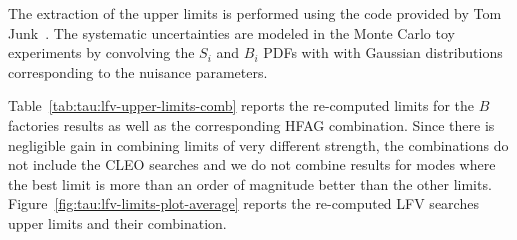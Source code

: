 The extraction of the upper limits is performed using the code provided by
Tom Junk~\cite{junk:2007:cdfnote}. The systematic uncertainties are modeled
in the Monte Carlo toy experiments by convolving the $S_i$ and $B_i$
PDFs with with Gaussian distributions corresponding to the nuisance
parameters. 

Table~\ref{tab:tau:lfv-upper-limits-comb} reports the re-computed limits
for the $B$ factories results as well as the corresponding HFAG
combination. Since there is negligible gain in combining limits of very
different strength, the combinations do not include the CLEO searches and we do not
combine results for modes where the best limit is more than an order of
magnitude better than the other limits.
Figure~\ref{fig:tau:lfv-limits-plot-average} reports the re-computed \mtau
LFV searches upper limits and their combination.

